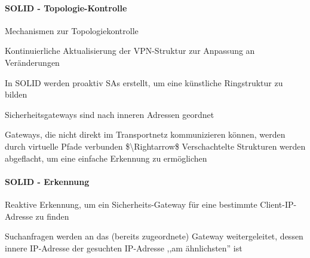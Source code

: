 \documentclass[a4paper]{article}
\begin{document}
\begin{multicols}{3}
\begin{itemize*}
            \paragraph{SOLID -
                  Topologie-Kontrolle}

            \begin{itemize*}
                  \item
                  Mechanismen zur Topologiekontrolle

                  \begin{itemize*}
                        \item Kontinuierliche Aktualisierung der VPN-Struktur zur Anpassung an Veränderungen
                  \end{itemize*}
                  \item
                  In SOLID werden proaktiv SAs erstellt, um eine künstliche Ringstruktur
                  zu bilden
                  \item
                  Sicherheitsgateways sind nach inneren Adressen geordnet
                  \item
                  Gateways, die nicht direkt im Transportnetz kommunizieren können,
                  werden durch virtuelle Pfade verbunden \$\textbackslash Rightarrow\$
                  Verschachtelte Strukturen werden abgeflacht, um eine einfache
                  Erkennung zu ermöglichen
            \end{itemize*}


            \paragraph{SOLID - Erkennung}

            \begin{itemize*}
                  \item
                  Reaktive Erkennung, um ein Sicherheits-Gateway für eine bestimmte
                  Client-IP-Adresse zu finden
                  \item
                  Suchanfragen werden an das (bereits zugeordnete) Gateway
                  weitergeleitet, dessen innere IP-Adresse der gesuchten IP-Adresse ,,am
                  ähnlichsten'' ist


\end{itemize*}
\end{itemize*}
\end{multicols}
\end{document}
